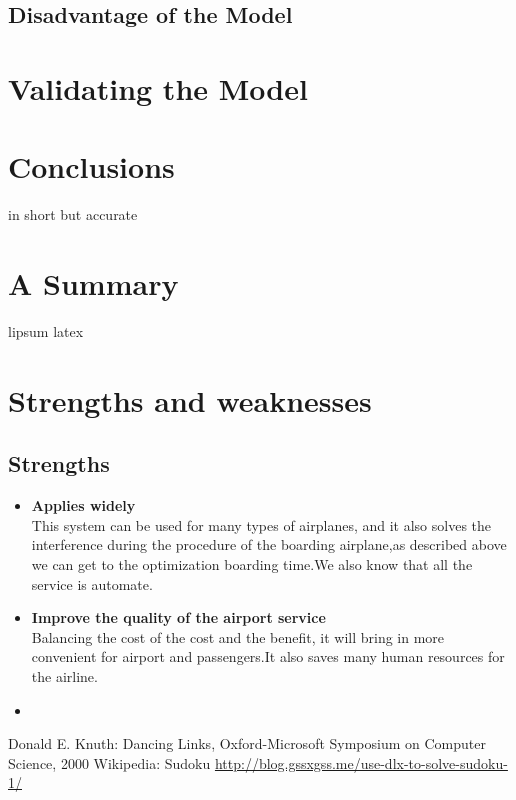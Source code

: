 \documentclass{mcmthesis}
\begin{document}
\subsection{Disadvantage of the Model}

\section{Validating the Model}


\section{Conclusions}
in short but accurate

\section{A Summary}
\lipsum[6]
lipsum latex

\section{Strengths and weaknesses}
\lipsum[12]

\subsection{Strengths}
\begin{itemize}
	\item \textbf{Applies widely}\\
	This  system can be used for many types of airplanes, and it also
	solves the interference during  the procedure of the boarding
	airplane,as described above we can get to the  optimization
	boarding time.We also know that all the service is automate.
	\item \textbf{Improve the quality of the airport service}\\
	Balancing the cost of the cost and the benefit, it will bring in
	more convenient  for airport and passengers.It also saves many
	human resources for the airline. \item \textbf{}
\end{itemize}

\begin{thebibliography}{99}
 Donald E. Knuth: Dancing Links, Oxford-Microsoft Symposium on Computer Science, 2000
	Wikipedia: Sudoku
\url{http://blog.gssxgss.me/use-dlx-to-solve-sudoku-1/}
\end{thebibliography}
\end{document}
